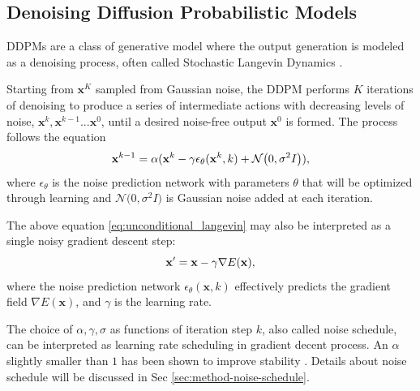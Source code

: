 \documentclass[Afour,sageh,times]{sagej}
\newcommand{\cheng}[1]{\textcolor{MyPurple}{[Cheng: #1]}}
\begin{document}
\subsection{Denoising Diffusion Probabilistic Models} 
\label{sec:ddpm}
DDPMs are a class of generative model where the output generation is modeled as a denoising process, often called Stochastic Langevin Dynamics \cite{welling2011bayesian}. 

Starting from $\mathbf{x}^K$ sampled from Gaussian noise, the DDPM performs $K$ iterations of denoising to produce a series of intermediate actions with decreasing levels of noise,
$\mathbf{x}^k, \mathbf{x}^{k-1} ...\mathbf{x}^{0} $, until a desired noise-free output $\mathbf{x}^0$ is formed.  
The process follows the equation
\vspace{-1mm}
\begin{equation}
    \textbf{x}^{k-1}=\alpha(\textbf{x}^{k}-\gamma\epsilon_\theta(\mathbf{x}^k,k) + \mathcal{N} \bigl(0, \sigma^2 I \bigl)),
    \label{eq:unconditional_langevin}
\vspace{-1mm}
\end{equation}
where $\epsilon_\theta$ is the noise prediction network with parameters $\theta$ that will be optimized through learning and $\mathcal{N} \bigl(0, \sigma^2 I \bigl)$ is Gaussian noise added at each iteration. 


The above equation \ref{eq:unconditional_langevin} may also be interpreted as a single noisy gradient descent step: 
\vspace{-2mm}
\begin{equation}
    \mathbf{x}'=\mathbf{x}-\gamma\nabla E(\mathbf{x}),
    \label{eq:gradient_descent}
\vspace{-1mm}
\end{equation}
where the noise prediction network $\epsilon_\theta(\mathbf{x},k)$ effectively predicts the gradient field $\nabla E(\mathbf{x})$, and  $\gamma$ is the learning rate. 

The choice of $\alpha,\gamma,\sigma$ as functions of iteration step $k$, also called noise schedule, can be interpreted as learning rate scheduling in gradient decent process. 
An $\alpha$ slightly smaller than $1$ has been shown to improve stability \cite{ho2020denoising}.
Details about noise schedule will be discussed in Sec \ref{sec:method-noise-schedule}.
\end{document}
